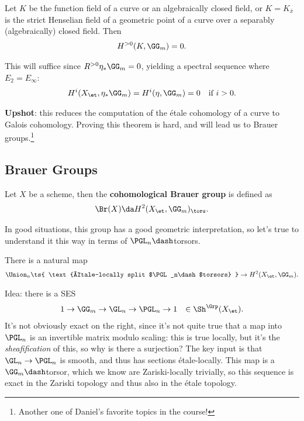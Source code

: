 \begin{theorem}[?]

Let \(K\) be the function field of a curve or an algebraically closed
field, or \(K = K_{\bar x}\) is the strict Henselian field of a
geometric point of a curve over a separably (algebraically) closed
field. Then
\begin{align*}  
H^{>0}(K, \GG_m) = 0
.\end{align*}

\end{theorem}

This will suffice since \(R^{>0} \eta_*\GG_m = 0\), yielding a spectral
sequence where \(E_2 = E_ \infty\):
\begin{align*}  
H^i(X_\et, \eta_* \GG_m)
=
H^i(\eta,\GG_m)
=
0 && \text{if }i>0
.\end{align*}

\textbf{Upshot}: this reduces the computation of the étale cohomology of
a curve to Galois cohomology. Proving this theorem is hard, and will
lead us to Brauer groups.\footnote{Another one of Daniel's favorite
  topics in the course!}

\hypertarget{brauer-groups}{%
\subsection{Brauer Groups}\label{brauer-groups}}

\begin{definition}

Let \(X\) be a scheme, then the \textbf{cohomological Brauer group} is
defined as
\begin{align*}  
\Br (X) \da H^2(X_\et, \GG_m)_{\tors}
.\end{align*}

\end{definition}

In good situations, this group has a good geometric interpretation, so
let's true to understand it this way in terms of \(\PGL_n\dash\)torsors.

\begin{claim}

There is a natural map
\begin{align*}  
\Union_n \ts{ \text{étale-locally split $\PGL_n\dash$torsors} }
\to
H^2(X_\et, \GG_m)
.\end{align*}

\end{claim}

Idea: there is a SES
\begin{align*}  
1 \to \GG_m \to \GL_n \to \PGL_n \to 1
&& \in \Sh^{\Grp}(X_\et)
.\end{align*} It's not obviously exact on the right, since it's not
quite true that a map into \(\PGL_n\) is an invertible matrix modulo
scaling: this is true locally, but it's the \emph{sheafification} of
this, so why is there a surjection? The key input is that
\(\GL_n\to \PGL_n\) is smooth, and thus has sections étale-locally. This
map is a \(\GG_m\dash\)torsor, which we know are Zariski-locally
trivially, so this sequence is exact in the Zariski topology and thus
also in the étale topology.

